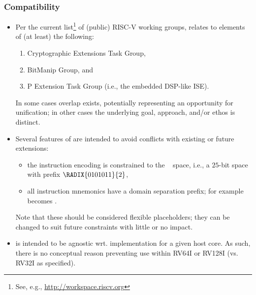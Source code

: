
\subsubsection{Compatibility}

\begin{itemize}

\item Per the current list\footnote{
      See, e.g., \url{http://workspace.riscv.org}
      } of (public) RISC-V working groups, 
      \XCID relates to elements of (at least) the following:

      \begin{enumerate}
      \item Cryptographic Extensions Task Group,
      \item BitManip                      Group,
            and
      \item P             Extension  Task Group (i.e., the embedded DSP-like ISE).
      \end{enumerate}

      \noindent
      In some cases overlap exists, potentially representing an opportunity
      for unification; in other cases the underlying goal, approach, and/or
      ethos is distinct.

\item Several features of \XCID are intended to avoid conflicts with existing 
      or future extensions:

      \begin{itemize}
      \item the instruction encoding is constrained to the 
            ~\cite[Table 19.1]{SCARV:RV:ISA:I:17}
            space, i.e., a $25$-bit space with prefix $\RADIX{0101011}{2}$,
      \item all instruction mnemonics have a domain separation prefix; for
            example  becomes .
      \end{itemize}
      
      \noindent
      Note that these should be considered flexible placeholders; they can
      be changed to suit future constraints with little or no impact.

\item \XCID is intended to be agnostic wrt. implementation for a given host 
      core.  As such, there is no conceptual reason preventing use within
      RV64I or RV128I (vs. RV32I as specified).  

\end{itemize}

